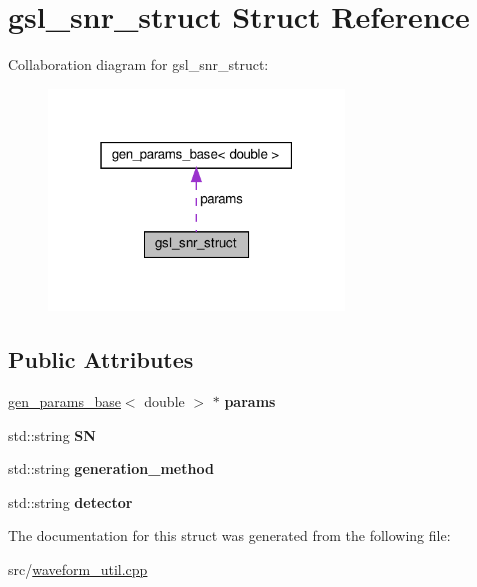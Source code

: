 \hypertarget{structgsl__snr__struct}{}\section{gsl\+\_\+snr\+\_\+struct Struct Reference}
\label{structgsl__snr__struct}


Collaboration diagram for gsl\+\_\+snr\+\_\+struct\+:\nopagebreak
\begin{figure}[H]
\begin{center}
\leavevmode
\includegraphics[width=223pt]{structgsl__snr__struct__coll__graph}
\end{center}
\end{figure}
\subsection*{Public Attributes}
\begin{DoxyCompactItemize}
\item 
\mbox{\label{structgsl__snr__struct_a0919a6d9e322d8c8192216608f39eaf1}} 
\hyperlink{classgen__params__base}{gen\+\_\+params\+\_\+base}$<$ double $>$ $\ast$ {\bfseries params}
\item 
\mbox{\label{structgsl__snr__struct_abb015712abe035f53feb741b1b41b48e}} 
std\+::string {\bfseries SN}
\item 
\mbox{\label{structgsl__snr__struct_a0bb473cdde3594f18d424fcb09eabee2}} 
std\+::string {\bfseries generation\+\_\+method}
\item 
\mbox{\label{structgsl__snr__struct_ae828927fe7077e108a7f5e065efadae8}} 
std\+::string {\bfseries detector}
\end{DoxyCompactItemize}


The documentation for this struct was generated from the following file\+:\begin{DoxyCompactItemize}
\item 
src/\hyperlink{waveform__util_8cpp}{waveform\+\_\+util.\+cpp}\end{DoxyCompactItemize}
